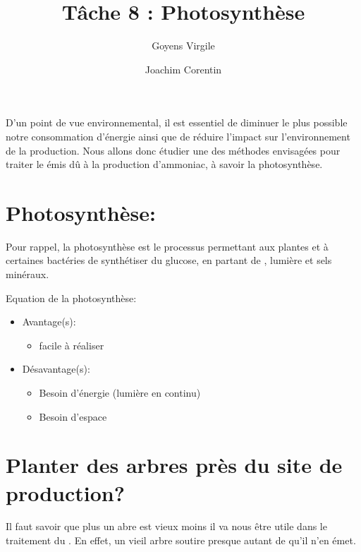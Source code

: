 \documentclass[10pt,a4paper]{article}
\title{Tâche 8 : Photosynthèse}
\author{Goyens Virgile \and Joachim Corentin}
\begin{document}
\maketitle

D'un point de vue environnemental, il est essentiel de diminuer le plus possible notre consommation d'énergie ainsi que de réduire l'impact sur l'environnement de la production. Nous allons donc étudier une des méthodes envisagées pour traiter le  émis dû à la production d'ammoniac, à savoir la photosynthèse.

\section{Photosynthèse:}
Pour rappel, la photosynthèse est le processus permettant aux plantes et à certaines bactéries de synthétiser du glucose, en partant de , lumière et sels minéraux.

Equation de la photosynthèse:

\begin{itemize}
\item Avantage(s): 
	\begin{itemize}
	\item facile à réaliser
	\end{itemize}
\item Désavantage(s): 
	\begin{itemize}
	\item Besoin d'énergie (lumière en continu)
	\item Besoin d'espace
	\end{itemize}
\end{itemize}

\section{Planter des arbres près du site de production?}

Il faut savoir que plus un abre est vieux moins il va nous être utile dans le traitement du . En effet, un vieil arbre soutire presque autant de  qu'il n'en émet.
\end{document}
